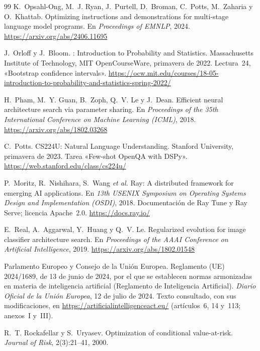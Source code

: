 \begin{thebibliography}{99}
K.~Opsahl-Ong, M.~J. Ryan, J.~Purtell, D.~Broman, C.~Potts, M.~Zaharia y O.~Khattab.
\newblock Optimizing instructions and demonstrations for multi-stage language model programs.
\newblock En \emph{Proceedings of EMNLP}, 2024.
\newblock \url{https://arxiv.org/abs/2406.11695}

J.~Orloff y J.~Bloom.
: Introduction to Probability and Statistics.
\newblock Massachusetts Institute of Technology, MIT OpenCourseWare, primavera de 2022. Lectura~24, «Bootstrap confidence intervals».
\newblock \url{https://ocw.mit.edu/courses/18-05-introduction-to-probability-and-statistics-spring-2022/}

H.~Pham, M.~Y. Guan, B.~Zoph, Q.~V. Le y J.~Dean.
\newblock Efficient neural architecture search via parameter sharing.
\newblock En \emph{Proceedings of the 35th International Conference on Machine Learning (ICML)}, 2018.
\newblock \url{https://arxiv.org/abs/1802.03268}

C.~Potts.
\newblock CS224U: Natural Language Understanding.
\newblock Stanford University, primavera de 2023. Tarea «Few-shot OpenQA with DSPy».
\newblock \url{https://web.stanford.edu/class/cs224u/}

P.~Moritz, R.~Nishihara, S.~Wang \emph{et al.}
\newblock Ray: A distributed framework for emerging AI applications.
\newblock En \emph{13th USENIX Symposium on Operating Systems Design and Implementation (OSDI)}, 2018. Documentación de Ray Tune y Ray Serve; licencia Apache~2.0.
\newblock \url{https://docs.ray.io/}

E.~Real, A.~Aggarwal, Y.~Huang y Q.~V. Le.
\newblock Regularized evolution for image classifier architecture search.
\newblock En \emph{Proceedings of the AAAI Conference on Artificial Intelligence}, 2019.
\newblock \url{https://arxiv.org/abs/1802.01548}

Parlamento Europeo y Consejo de la Unión Europea.
\newblock Reglamento (UE) 2024/1689, de 13 de junio de 2024, por el que se establecen normas armonizadas en materia de inteligencia artificial (Reglamento de Inteligencia Artificial).
\newblock \emph{Diario Oficial de la Unión Europea}, 12 de julio de 2024. Texto consultado, con sus modificaciones, en \url{https://artificialintelligenceact.eu/} (artículos~6, 14 y~113; anexos~I y~III).

R.~T. Rockafellar y S.~Uryasev.
\newblock Optimization of conditional value-at-risk.
\newblock \emph{Journal of Risk}, 2(3):21--41, 2000.


\end{thebibliography}
